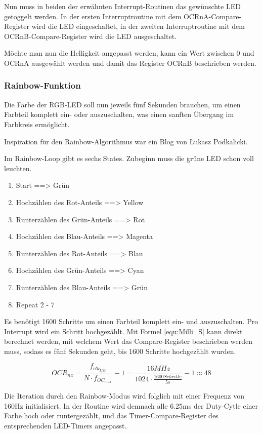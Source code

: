 Nun muss in beiden der erwähnten Interrupt-Routinen das gewünschte LED getoggelt werden. In der ersten Interruptroutine mit dem OCRnA-Compare-Register wird die LED eingeschaltet, in der zweiten Interruptroutine mit dem OCRnB-Compare-Register wird die LED ausgeschaltet.

Möchte man nun die Helligkeit angepasst werden, kann ein Wert zwischen 0 und OCRnA ausgewählt werden und damit das Register OCRnB beschrieben werden.

\subsubsection{Rainbow-Funktion}

Die Farbe der RGB-LED soll nun jeweils fünf Sekunden brauchen, um einen Farbteil komplett ein- oder auszuschalten, was einen sanften Übergang im Farbkreis ermöglicht.

Inspiration für den Rainbow-Algorithmus war ein Blog von Łukasz Podkalicki. \cite{podkalicki_attiny13_2016}

Im Rainbow-Loop gibt es sechs States. Zubeginn muss die grüne LED schon voll leuchten.
\begin{enumerate}
\item Start ==> Grün
\item Hochzählen des Rot-Anteils ==> Yellow
\item Runterzählen des Grün-Anteils ==> Rot
\item Hochzählen des Blau-Anteils ==> Magenta
\item Runterzählen des Rot-Anteils ==> Blau
\item Hochzählen des Grün-Anteils ==> Cyan
\item Runterzählen des Blau-Anteils ==> Grün
\item Repeat 2 - 7
\end{enumerate}

Es benötigt 1600 Schritte um einen Farbteil komplett ein- und auszuschalten. Pro Interrupt wird ein Schritt hochgezählt. Mit Formel \ref{equ:Milli_S} kann direkt berechnet werden, mit welchem Wert das Compare-Register beschrieben werden muss, sodass es fünf Sekunden geht, bis 1600 Schritte hochgezählt wurden.

\begin{equation}
OCR_{nx} = \frac{f_{clk_{I/O}}}{N \cdot f_{OC_{max}}} - 1 = \frac{16MHz}{1024 \cdot \frac{1600 Schritte}{5s}} - 1 \approx 48
\label{equ:Milli_S}
\end{equation}

Die Iteration durch den Rainbow-Modus wird folglich mit einer Frequenz von 160Hz initialisiert. In der Routine wird demnach alle 6.25ms der Duty-Cytle einer Farbe hoch oder runtergezählt, und das Timer-Compare-Register des entsprechenden LED-Timers angepasst.